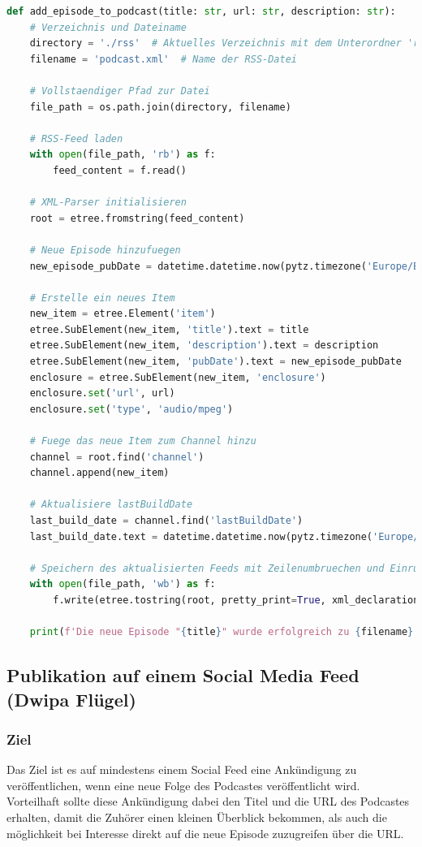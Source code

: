 \documentclass{article}
\begin{document}
\begin{lstlisting}[language=Python, caption=Vollständige Funktion des RSS-Feed Generators]
def add_episode_to_podcast(title: str, url: str, description: str):
    # Verzeichnis und Dateiname
    directory = './rss'  # Aktuelles Verzeichnis mit dem Unterordner 'rss'
    filename = 'podcast.xml'  # Name der RSS-Datei

    # Vollstaendiger Pfad zur Datei
    file_path = os.path.join(directory, filename)

    # RSS-Feed laden
    with open(file_path, 'rb') as f:
        feed_content = f.read()

    # XML-Parser initialisieren
    root = etree.fromstring(feed_content)

    # Neue Episode hinzufuegen
    new_episode_pubDate = datetime.datetime.now(pytz.timezone('Europe/Berlin')).strftime('%a, %d %b %Y %H:%M:%S %z')

    # Erstelle ein neues Item
    new_item = etree.Element('item')
    etree.SubElement(new_item, 'title').text = title
    etree.SubElement(new_item, 'description').text = description
    etree.SubElement(new_item, 'pubDate').text = new_episode_pubDate
    enclosure = etree.SubElement(new_item, 'enclosure')
    enclosure.set('url', url)
    enclosure.set('type', 'audio/mpeg')

    # Fuege das neue Item zum Channel hinzu
    channel = root.find('channel')
    channel.append(new_item)

    # Aktualisiere lastBuildDate
    last_build_date = channel.find('lastBuildDate')
    last_build_date.text = datetime.datetime.now(pytz.timezone('Europe/Berlin')).strftime('%a, %d %b %Y %H:%M:%S %z')

    # Speichern des aktualisierten Feeds mit Zeilenumbruechen und Einrueckungen
    with open(file_path, 'wb') as f:
        f.write(etree.tostring(root, pretty_print=True, xml_declaration=True, encoding='UTF-8'))

    print(f'Die neue Episode "{title}" wurde erfolgreich zu {filename} hinzugefuegt.')
\end{lstlisting}

\subsection{Publikation auf einem Social Media Feed \small{(Dwipa Flügel)}}

\subsubsection{Ziel}
Das Ziel ist es auf mindestens einem Social Feed eine Ankündigung zu veröffentlichen, wenn eine neue Folge des Podcastes veröffentlicht wird. Vorteilhaft sollte diese Ankündigung dabei den Titel und die URL des Podcastes erhalten, damit die Zuhörer einen kleinen Überblick bekommen, als auch die möglichkeit bei Interesse direkt auf die neue Episode zuzugreifen über die URL.
\end{document}
